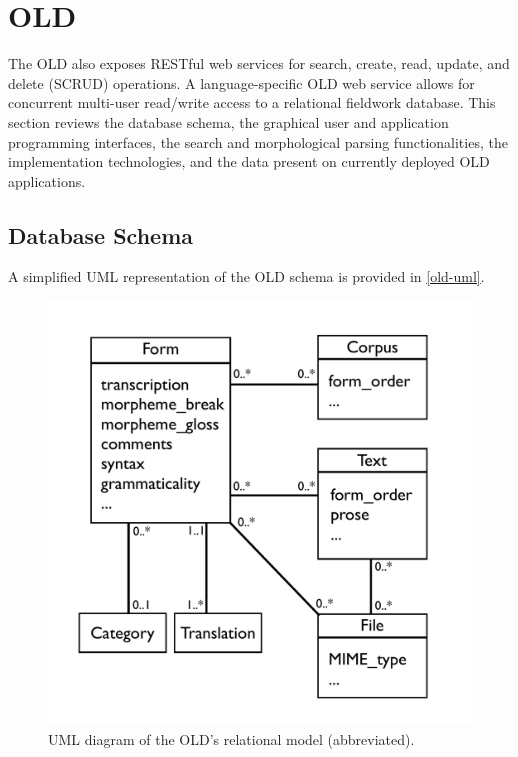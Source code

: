 \documentclass[11pt]{article}
\begin{document}
\section{OLD}
\label{old-api}

The OLD also exposes RESTful web services for search, create, read, update, and delete
(SCRUD) operations. A language-specific OLD web service allows for concurrent
multi-user read/write access to a relational fieldwork database. This section
 reviews the database schema, the graphical user and
application programming interfaces, the search and morphological parsing
functionalities, the implementation technologies, and the data present on
currently deployed OLD applications.


\subsection{Database Schema}

A simplified UML representation of the OLD schema is provided in
\autoref{old-uml}. 

\begin{figure}[h]
\begin{center}
\includegraphics[scale=0.35]{images/OLD_relational_model_UML.pdf}
\caption{UML diagram of the OLD's relational model (abbreviated).}
\label{old-uml}
\end{center}
\end{figure}
\end{document}
